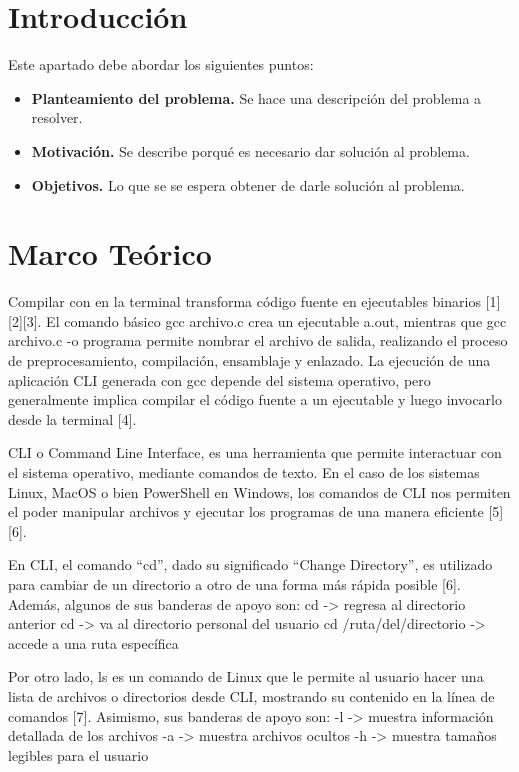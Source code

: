 \documentclass[letterpaper,12pt,oneside]{article}
\begin{document}
\tableofcontents
\clearpage
    

\section{Introducción}

Este apartado debe abordar los siguientes puntos:

\begin{itemize}
    \item \textbf{Planteamiento del problema.} Se hace una descripción del problema a resolver.
    \item \textbf{Motivación.} Se describe porqué es necesario dar solución al problema.
    \item \textbf{Objetivos.} Lo que se se espera obtener de darle solución al problema.
\end{itemize}

\section{Marco Teórico}

Compilar con en la terminal transforma código fuente en ejecutables binarios [1][2][3]. El comando básico gcc archivo.c crea un ejecutable a.out, mientras que gcc archivo.c -o programa permite nombrar el archivo de salida, realizando el proceso de preprocesamiento, compilación, ensamblaje y enlazado.  
La ejecución de una aplicación CLI generada con gcc depende del sistema operativo, pero generalmente implica compilar el código fuente a un ejecutable y luego invocarlo desde la terminal [4].

CLI o Command Line Interface, es una herramienta que permite interactuar con el sistema operativo, mediante comandos de texto. En el caso de los sistemas Linux, MacOS o bien PowerShell en Windows, los comandos de CLI nos permiten el poder manipular archivos y ejecutar los programas de una manera eficiente [5][6].

En CLI, el comando “cd”, dado su significado “Change Directory”, es utilizado para cambiar de un directorio a otro de una forma más rápida posible [6]. Además, algunos de sus banderas de apoyo son:  
cd -> regresa al directorio anterior  
cd -> va al directorio personal del usuario  
cd /ruta/del/directorio -> accede a una ruta específica  

Por otro lado, ls es un comando de Linux que le permite al usuario hacer una lista de archivos o directorios desde CLI, mostrando su contenido en la línea de comandos [7]. Asimismo, sus banderas de apoyo son:  
-l -> muestra información detallada de los archivos  
-a -> muestra archivos ocultos  
-h -> muestra tamaños legibles para el usuario  
\end{document}
